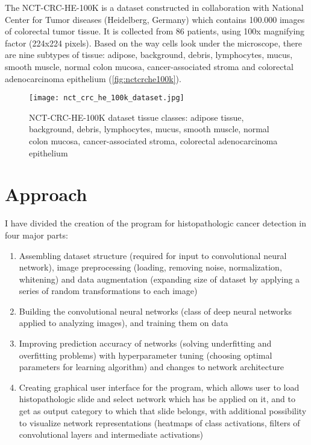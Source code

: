 The NCT-CRC-HE-100K \cite{kather_jakob_nikolas_2018_1214456} is a dataset constructed in collaboration with National Center for Tumor diseases (Heidelberg, Germany) which contains 100.000 images of colorectal tumor tissue. It is collected from 86 patients, using 100x magnifying factor (224x224 pixels). Based on the way cells look under the microscope, there are nine subtypes of tissue: adipose, background, debris, lymphocytes, mucus, smooth muscle, normal colon mucosa, cancer-associated stroma and colorectal adenocarcinoma epithelium (\textcolor{red}{\autoref{fig:nctcrche100k}}).

\begin{figure}[h]
	\centering
	\texttt{[image: nct\_crc\_he\_100k\_dataset.jpg]}
	\caption{NCT-CRC-HE-100K dataset tissue classes: adipose tissue, background, debris, lymphocytes, mucus, smooth muscle, normal colon mucosa, cancer-associated stroma, colorectal adenocarcinoma epithelium}
	\label{fig:nctcrche100k}
\end{figure}

\section{Approach}

I have divided the creation of the program for histopathologic cancer detection in four major parts:
\begin{enumerate}
	\itemsep0em
	\item Assembling dataset structure (required for input to convolutional neural network), image preprocessing (loading, removing noise, normalization, whitening) and data augmentation (expanding size of dataset by applying a series of random transformations to each image)
	\item Building the convolutional neural networks (class of deep neural networks applied to analyzing images), and training them on data
	\item Improving prediction accuracy of networks (solving underfitting and overfitting problems) with hyperparameter tuning (choosing optimal parameters for learning algorithm) and changes to network architecture
	\item Creating graphical user interface for the program, which allows user to load histopathologic slide and select network which has be applied on it, and to get as output category to which that slide belongs, with additional possibility to visualize network representations (heatmaps of class activations, filters of convolutional layers and intermediate activations)
\end{enumerate}

